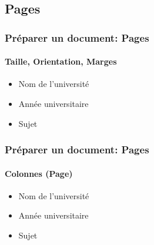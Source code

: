 \documentclass[xcolor=table]{beamer}
\begin{document}
\subsection{Pages}

\begin{frame}[t]
\frametitle{Préparer un document: Pages}
\framesubtitle{Taille, Orientation, Marges}

\begin{minipage}{0.38\textwidth}
	\begin{itemize}
		\item Nom de l'université 
		\item Année universitaire
		\item Sujet
	\end{itemize}
\end{minipage}
\begin{minipage}{0.6\textwidth}
\end{minipage}

\end{frame}

\begin{frame}[t]
\frametitle{Préparer un document: Pages}
\framesubtitle{Colonnes (Page)}

\begin{minipage}{0.38\textwidth}
\begin{itemize}
\item Nom de l'université 
\item Année universitaire
\item Sujet
\end{itemize}
\end{minipage}
\begin{minipage}{0.6\textwidth}
\end{minipage}

\end{frame}
\end{document}
